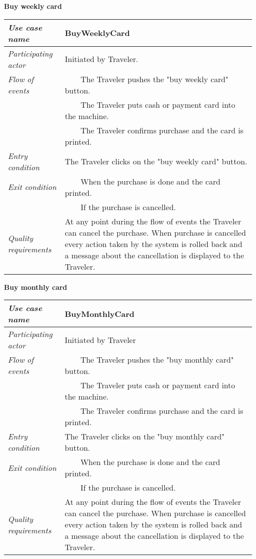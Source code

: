 \documentclass[10pt]{report}
\newcommand{\tabitem}{~~\llap{\textbullet}~~}
\numberwithin{equation}{section} %
\numberwithin{figure}{section} %
\numberwithin{table}{section} %
\begin{document}
\begin{table}[H]
\noindent \textbf{Buy weekly card}\\
\begin{tabularx}{\textwidth}{l X}
\midrule
\textit{Use case name} & BuyWeeklyCard \\ \midrule
\textit{Participating actor} & Initiated by Traveler. \\ \midrule
\textit{Flow of events} & \tabitem The Traveler pushes the "buy weekly card" button. \\
						& \tabitem The Traveler puts cash or payment card into the machine.\\
                        & \tabitem The Traveler confirms purchase and the card is printed.\\
                        \midrule
\textit{Entry condition} & The Traveler clicks on the "buy weekly card" button.\\ \midrule
\textit{Exit condition} & \tabitem When the purchase is done and the card printed.\\
						& \tabitem If the purchase is cancelled.\\
                        \midrule
\textit{Quality requirements} & At any point during the flow of events the Traveler can cancel the purchase. When purchase is cancelled every action taken by the system is rolled back and a message about the cancellation is displayed to the Traveler. \\ \midrule
\end{tabularx}
\end{table}

\begin{table}[H]
\noindent \textbf{Buy monthly card}\\
\begin{tabularx}{\textwidth}{l X}
\midrule
\textit{Use case name} & BuyMonthlyCard \\ \midrule
\textit{Participating actor} & Initiated by Traveler \\ \midrule
\textit{Flow of events} & \tabitem The Traveler pushes the "buy monthly card" button.\\
						& \tabitem The Traveler puts cash or payment card into the machine.\\
                        & \tabitem The Traveler confirms purchase and the card is printed.\\
                        \midrule
\textit{Entry condition} & The Traveler clicks on the "buy monthly card" button.\\ \midrule
\textit{Exit condition} & \tabitem When the purchase is done and the card printed. \\
						& \tabitem If the purchase is cancelled.\\
                        \midrule
\textit{Quality requirements} & At any point during the flow of events the Traveler can cancel the purchase. When purchase is cancelled every action taken by the system is rolled back and a message about the cancellation is displayed to the Traveler. \\ \midrule
\end{tabularx}
\end{table}
\end{document}
